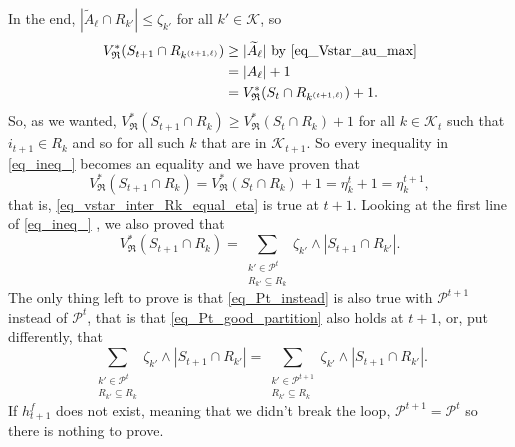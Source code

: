 \documentclass[
  11pt,
  a4paper,
]{article}
\theoremstyle{plain}
\theoremstyle{plain}
\theoremstyle{definition}
\theoremstyle{plain}
\theoremstyle{definition}
\theoremstyle{remark}
\begin{document}
In the end, \(|\widetilde A_\ell \cap R_{k'} |\leq \zeta_{k'}\) for all
\(k'\in\mathcal{K}\), so \begin{align*}
V^*_{\mathfrak{R}}( S_{t+1}\cap R_{k^{(t+1,\ell)}})&\geq | \widetilde A_\ell | \text{ by \eqref{eq_Vstar_au_max}}\\
&=  |  A_\ell | +1\\
&= V^*_{\mathfrak{R}}( S_{t}\cap R_{k^{(t+1,\ell)}}) +1.
\end{align*} So, as we wanted,
\(V^*_{\mathfrak{R}}(S_{t+1}\cap R_k)\geq V^*_{\mathfrak{R}}(S_{t}\cap R_k)+1\)
for all \(k\in\mathcal{K}_{t}\) such that \(i_{t+1}\in R_k\) and so for
all such \(k\) that are in \(\mathcal{K}_{t+1}\). So every inequality in
\eqref{eq_ineq_} becomes an equality and we have proven that
\begin{equation*}
V^*_{\mathfrak{R}}(S_{t+1}\cap R_k) = V^*_{\mathfrak{R}}(S_{t}\cap R_k)+1 =\eta^t_k+1= \eta^{t+1}_k,
\end{equation*} that is, \eqref{eq_vstar_inter_Rk_equal_eta} is true at
\(t+1\). Looking at the first line of \eqref{eq_ineq_} , we also proved
that \begin{equation}
V^*_{\mathfrak{R}}(S_{t+1}\cap R_k) =  \sum_{\substack{k'\in\mathcal{P}^{t}\\R_{k'}\subseteq R_k}} \zeta_{k'}\wedge |S_{t+1}\cap R_{k'}| . \label{eq_Pt_instead}
\end{equation} The only thing left to prove is that
\eqref{eq_Pt_instead} is also true with \(\mathcal{P}^{t+1}\) instead of
\(\mathcal{P}^{t}\), that is that \eqref{eq_Pt_good_partition} also
holds at \(t+1\), or, put differently, that
\begin{equation}\label{eq_last_goal}
\sum_{\substack{k'\in\mathcal{P}^{t}\\R_{k'}\subseteq R_k}} \zeta_{k'}\wedge |S_{t+1}\cap R_{k'}|=\sum_{\substack{k'\in\mathcal{P}^{t+1}\\R_{k'}\subseteq R_k}} \zeta_{k'}\wedge |S_{t+1}\cap R_{k'}|.
\end{equation} If \(h^f_{t+1}\) does not exist, meaning that we didn't
break the loop, \(\mathcal{P}^{t+1}=\mathcal{P}^t\) so there is nothing
to prove.
\end{document}
